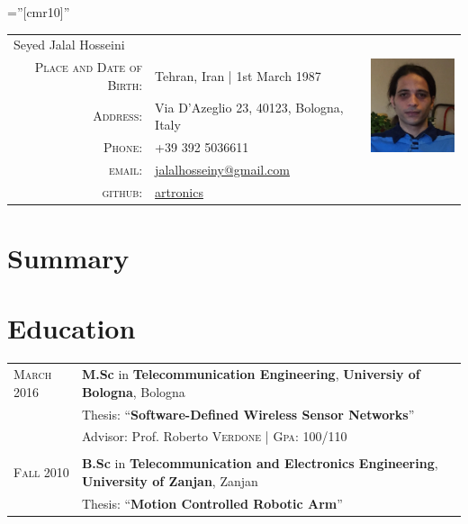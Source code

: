 \documentclass[a4paper,10pt]{article}
\begin{document}
\pagestyle{empty} %

\font\fb=''[cmr10]'' %



\begin{tabular}{rll}
    \multicolumn{2}{l}{\LARGE Seyed Jalal Hosseini} &
    \multirow{5}{*}{\includegraphics[width=30mm]{img/img02.jpg}}\\[1.3ex]
    \textsc{Place and Date of Birth:} & Tehran, Iran  | 1st March 1987 &\\
    \textsc{Address:}   & Via D'Azeglio 23, 40123, Bologna, Italy &\\
    \textsc{Phone:}     & +39 392 5036611&\\
    \textsc{email:}     & \href{mailto:jalalhosseiny@gmail.com}{jalalhosseiny@gmail.com}&\\
    \textsc{github:}     & \href{https://github.com/artronics}{artronics}&
\end{tabular}

\section{Summary}


\section{Education}
\begin{tabularx}{\textwidth}{p{}|p{}}
	\textsc{March} 2016 & \textbf{M.Sc} in \textbf{Telecommunication Engineering}, \textbf{Universiy of Bologna}, Bologna\\
    & Thesis: ``\textbf{Software-Defined Wireless Sensor Networks}'' \\& \small Advisor: Prof. Roberto \textsc{Verdone} | \normalsize \textsc{Gpa}: 100/110\\\multicolumn{2}{c}{} \\
	\textsc{Fall} 2010& \textbf{B.Sc} in \textbf{Telecommunication and Electronics Engineering}, \normalsize\textbf{University of Zanjan}, Zanjan\\
    & Thesis: ``\textbf{Motion Controlled Robotic Arm}''
\end{tabularx}
\end{document}
